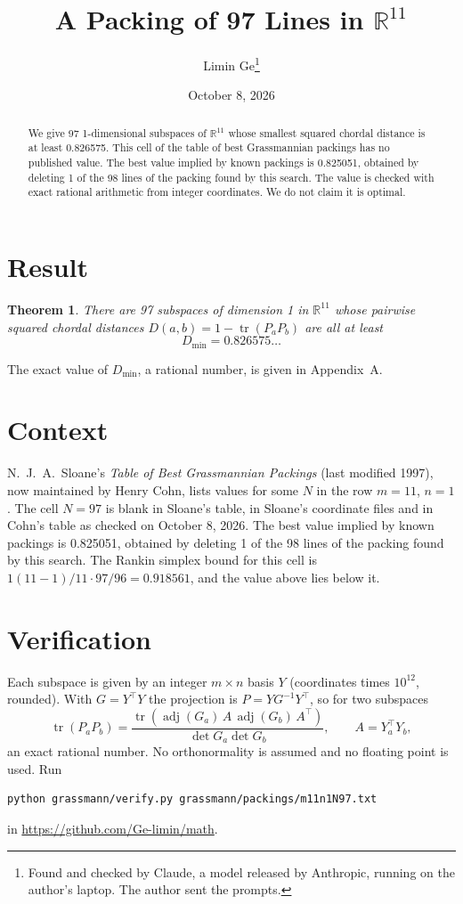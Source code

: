 \documentclass[11pt,a4paper]{article}
\title{A Packing of 97 Lines in $\mathbb{R}^{11}$}
\author{Limin Ge\thanks{Found and checked by Claude, a model released by Anthropic, running on the author's laptop. The author sent the prompts.}}
\date{October 8, 2026}
\newtheorem*{theorem}{Theorem}
\begin{document}
\maketitle
\begin{abstract}
We give 97 1-dimensional subspaces of $\mathbb{R}^{11}$ whose smallest squared chordal distance is at least 0.826575. This cell of the table of best Grassmannian packings has no published value. The best value implied by known packings is 0.825051, obtained by deleting 1 of the 98 lines of the packing found by this search. The value is checked with exact rational arithmetic from integer coordinates. We do not claim it is optimal.
\end{abstract}

\section{Result}
\begin{theorem}
There are 97 subspaces of dimension 1 in $\mathbb{R}^{11}$ whose pairwise squared chordal distances $D(a,b) = 1 - \operatorname{tr}(P_aP_b)$ are all at least
\[ D_{\min} = 0.826575\ldots \]
\end{theorem}
The exact value of $D_{\min}$, a rational number, is given in Appendix~A.


\section{Context}
N.~J.~A.~Sloane's \emph{Table of Best Grassmannian Packings} (last modified 1997), now maintained by Henry Cohn, lists values for some $N$ in the row $m=11$, $n=1$. The cell $N=97$ is blank in Sloane's table, in Sloane's coordinate files and in Cohn's table as checked on October 8, 2026. The best value implied by known packings is 0.825051, obtained by deleting 1 of the 98 lines of the packing found by this search. The Rankin simplex bound for this cell is $1(11-1)/11\cdot 97/96 = 0.918561$, and the value above lies below it.


\section{Verification}
Each subspace is given by an integer $m\times n$ basis $Y$ (coordinates times $10^{12}$, rounded). With $G=Y^\top Y$ the projection is $P=YG^{-1}Y^\top$, so for two subspaces
\[ \operatorname{tr}(P_aP_b)=\frac{\operatorname{tr}(\operatorname{adj}(G_a)\,A\,\operatorname{adj}(G_b)\,A^\top)}{\det G_a\det G_b},\qquad A=Y_a^\top Y_b, \]
an exact rational number. No orthonormality is assumed and no floating point is used. Run
\begin{verbatim}
python grassmann/verify.py grassmann/packings/m11n1N97.txt
\end{verbatim}
in \url{https://github.com/Ge-limin/math}.
\end{document}
